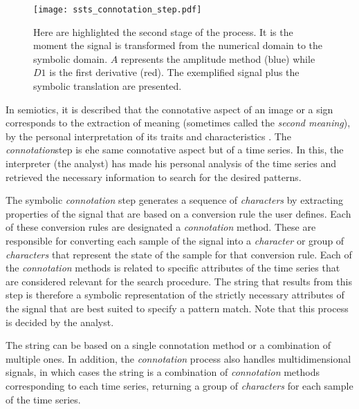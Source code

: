 \begin{figure}
\centering
\texttt{[image: ssts\_connotation\_step.pdf]}
\caption{Here are highlighted the second stage of the process. It is the moment the signal is transformed from the numerical domain to the symbolic domain. $A$ represents the amplitude method (blue) while $D1$ is the first derivative (red). The exemplified signal plus the symbolic translation are presented.}
\label{fig:ssts_connotation}
\end{figure}

In semiotics, it is described that the connotative aspect of an image or a sign corresponds to the extraction of meaning (sometimes called the \textit{second meaning}), by the personal interpretation of its traits and characteristics \cite{connotation}. The \textit{connotation}step is ehe same connotative aspect but of a time series. In this, the interpreter (the analyst) has made his personal analysis of the time series and retrieved the necessary information to search for the desired patterns. 
\par
The symbolic \textit{connotation} step generates a sequence of \textit{characters} by extracting properties of the signal that are based on a conversion rule the user defines. Each of these conversion rules are designated a \textit{connotation} method. These are responsible for converting each sample of the signal into a \textit{character} or group of \textit{characters} that represent the state of the sample for that conversion rule. Each of the \textit{connotation} methods is related to specific attributes of the time series that are considered relevant for the search procedure. The string that results from this step is therefore a symbolic representation of the strictly necessary attributes of the signal that are best suited to specify a pattern match. Note that this process is decided by the analyst.
\par
The string can be based on a single connotation method or a combination of multiple ones. In addition, the \textit{connotation} process also handles multidimensional signals, in which cases the string is a combination of \textit{connotation} methods corresponding to each time series, returning a group of \textit{characters} for each sample of the time series.
\par
